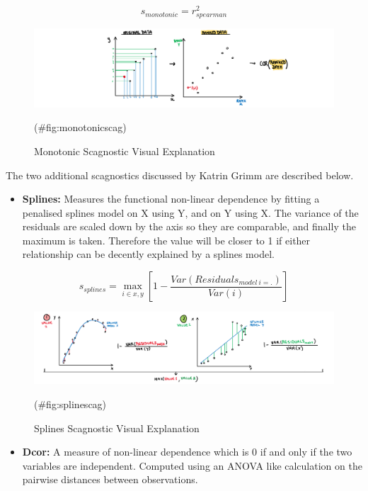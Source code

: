 \[s_{monotonic} = r^2_{spearman}\]

\begin{Schunk}
\begin{figure}
\includegraphics[width=1\linewidth,height=0.2\textheight]{figures/drawmonotonic} \caption[Monotonic Scagnostic Visual Explanation]{Monotonic Scagnostic Visual Explanation}(\#fig:monotonicscag)
\end{figure}
\end{Schunk}

The two additional scagnostics discussed by Katrin Grimm are described
below.

\begin{itemize}
\tightlist
\item
  \textbf{Splines:} Measures the functional non-linear dependence by
  fitting a penalised splines model on X using Y, and on Y using X. The
  variance of the residuals are scaled down by the axis so they are
  comparable, and finally the maximum is taken. Therefore the value will
  be closer to 1 if either relationship can be decently explained by a
  splines model.
\end{itemize}

\[s_{splines}=\max_{i\in x,y}[1-\frac{Var(Residuals_{model~i=.})}{Var(i)}]\]

\begin{Schunk}
\begin{figure}
\includegraphics[width=1\linewidth,height=0.2\textheight]{figures/drawsplines} \caption[Splines Scagnostic Visual Explanation]{Splines Scagnostic Visual Explanation}(\#fig:splinescag)
\end{figure}
\end{Schunk}

\begin{itemize}
\tightlist
\item
  \textbf{Dcor:} A measure of non-linear dependence which is 0 if and
  only if the two variables are independent. Computed using an ANOVA
  like calculation on the pairwise distances between observations.
\end{itemize}


